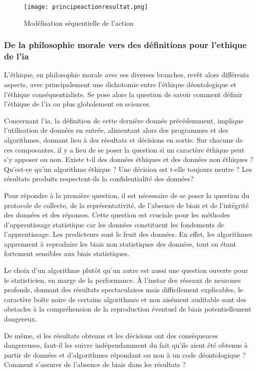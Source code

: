 \begin{figure}[ht]
  \texttt{[image: principeactionresultat.png]}
  \caption{Modélisation séquentielle de l'action}
\end{figure}
\subsubsection{De la philosophie morale vers des définitions pour l'ethique de l'\gls{ia}}

L'éthique, en philosophie morale avec ses diverses branches, revêt alors différents aspects, avec principalement une dichotomie entre l'éthique déontologique et l'éthique conséquentialiste. Se pose alors la question de savoir comment définir l'éthique de l'\gls{ia} ou plus globalement en sciences.

Concernant l'\gls{ia}, la définition de cette dernière donnée précédemment, implique l'utilisation de données en entrée, alimentant alors des programmes et des algorithmes, donnant lieu à des résultats et décisions en sortie. Sur chacune de ces composantes, il y a lieu de se poser la question si un caractère éthique peut s'y apposer ou non. Existe t-il des données éthiques et des données non éthiques ? Qu'est-ce qu'un algorithme éthique ? Une décision est t-elle toujours neutre ? Les résultats produits respectent-ils la confidentialité des données?

Pour répondre à la première question, il est nécessaire de se poser la question du protocole de collecte, de la représentativité, de l'absence de biais et de l'intégrité des données et des réponses. Cette question est cruciale pour les méthodes d'apprentissage statistique car les données constituent les fondements de l'apprentissage. Les predicteurs sont le fruit des données. En effet, les algorithmes apprennent à reproduire les biais non statistiques des données, tout en étant fortement sensibles aux biais statistiques.

Le choix d'un algorithme plutôt qu'un autre est aussi une question ouverte pour le statisticien, en marge de la performance. À l'instar des réseaux de neurones profonds, donnant des résultats spectaculaires mais difficilement explicables, le caractère boîte noire de certains algorithmes et non aisément auditable sont des obstacles à la compréhension de la reproduction éventuel de biais potentiellement dangereux.

De même, si les résultats obtenus et les décisions ont des conséquences dangereuses, faut-il les suivre indépendamment du fait qu'ils aient été obtenus à partir de données et d'algorithmes répondant ou non à un code déontologique ? Comment s'assurer de l'absence de biais dans les résultats ?

